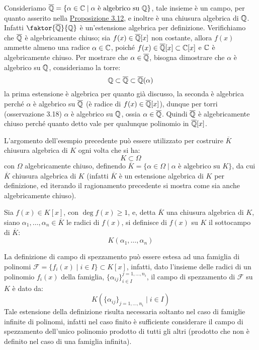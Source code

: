 \documentclass[11pt]{scrartcl}
\begin{document}
\begin{example}
    Consideriamo $\overline{\mathbb Q} = \{\alpha \in \mathbb C \mid \text{$\alpha$ è algebrico su $\mathbb Q$}\}$, tale insieme è un campo, per quanto asserito nella
    \hyperref[3.12]{Proposizione 3.12}, e inoltre è una chiusura algebrica di $\mathbb Q$. 
    Infatti $\faktor{\overline\QQ}{\QQ}$ è un'estensione algebrica per definizione.
    Verifichiamo che $\overline{\mathbb Q}$ è algebricamente chiuso; sia $f(x) \in \overline{\mathbb Q}[x]$ non costante, 
    allora $f(x)$ ammette almeno una radice $\alpha \in \mathbb C$, poiché $f(x) \in \overline{\mathbb Q}[x] \subset \mathbb C[x]$ e $\mathbb C$ è algebricamente chiuso. 
    Per mostrare che $\alpha \in \overline{\mathbb Q}$, bisogna
    dimostrare che $\alpha$ è algebrico su $\mathbb Q$, consideriamo la torre:
    \[ \mathbb Q \subset \overline {\mathbb Q} \subset \overline{\mathbb Q} (\alpha)
        \]
    la prima estensione è algebrica per quanto già discusso, 
    la seconda è algebrica perché $\alpha$ è algebrico su $\overline{\mathbb Q}$ (è radice di $f(x) \in \overline{\mathbb Q}[x]$),
    dunque per torri (osservazione 3.18) $\alpha$ è algebrico su $\mathbb Q$, ossia $\alpha \in \overline{\mathbb Q}$. 
    Quindi $\overline{\mathbb Q}$ è algebricamente chiuso perché quanto detto vale per qualunque polinomio in $\overline{\mathbb Q}[x]$.
\end{example}

\begin{remark}
    L'argomento dell'esempio precedente può essere utilizzato per costruire $\overline K$ chiusura algebrica di $K$ ogni volta che si ha:
    \[ K \subset \Omega
        \]
    con $\Omega$ algebricamente chiuso, definendo $\overline K = \{\alpha \in \Omega \mid \text{$\alpha$ è algebrico su $K$}\}$, da cui $\overline K$ chiusura algebrica di $K$ (infatti $\overline K$ è un estensione algebrica 
    di $K$ per definizione, ed iterando il ragionamento precedente si mostra come sia anche algebricamente chiuso).
\end{remark}

\begin{definition}
    Sia $f(x) \in K[x]$, con $\deg f(x) \geq 1$, e, detta $\overline K$ una chiusura algebrica di $K$, siano $\alpha_1,\ldots,\alpha_n \in \overline K$ le radici di $f(x)$, si definisce  di $f(x)$ su $K$ il sottocampo di $\overline K$:
    \[ K(\alpha_1,\ldots,\alpha_n)
        \]
\end{definition}

\begin{remark}
    La definizione di campo di spezzamento può essere estesa ad una famiglia di polinomi $\mathcal{F} = \{f_i(x) \mid i \in I\} \subset K[x]$, infatti, dato l'insieme delle radici di un polinomio $f_i(x)$ della famiglia,
    $ \{\alpha_{ij}\}_{i \in I}^{j = 1,\ldots,n_i} $, il campo di spezzamento di $\mathcal{F}$ su $K$ è dato da:
    \[ K(\{\alpha_{ij}\}_{j = 1,\ldots,n_i} \mid i \in I)
        \]
    Tale estensione della definizione risulta necessaria soltanto nel caso di famiglie infinite di polinomi, infatti nel caso finito è sufficiente considerare il campo di spezzamento dell'unico polinomio prodotto di tutti gli altri 
    (prodotto che non è definito nel caso di una famiglia infinita).
\end{remark}
\end{document}
